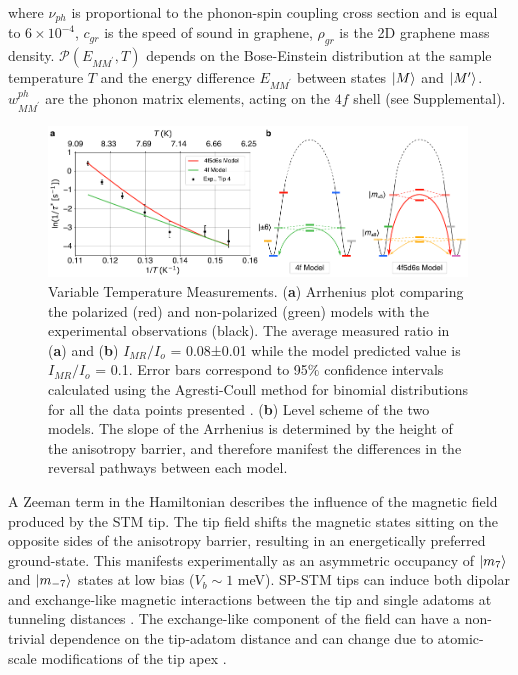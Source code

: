 \documentclass[
reprint,amsmath,amssymb,aps]{revtex4-2}
\begin{document}
where $\nu_{ph}$ is proportional to the phonon-spin coupling cross section and is equal to $6 \times 10^{-4}$, $c_{gr}$ is the speed of sound in graphene, $\rho_{gr}$ is the 2D graphene mass density. $\mathcal{P}\left( E_{MM^{\prime}}, T \right)$ depends on the Bose-Einstein distribution at the sample temperature $T$ and the energy difference $E_{MM^{\prime}}$ between states $\ket{M}$ and $\ket{M^{\prime}}$. $w^{ph}_{MM^{\prime}}$ are the phonon matrix elements, acting on the $4f$ shell (see Supplemental).

\begin{figure}[t!]
\includegraphics[width=0.99\textwidth]{Fig3_new.pdf}
\caption{Variable Temperature Measurements. (\textbf{a}) Arrhenius plot comparing the polarized (red) and non-polarized (green) models with the experimental observations (black). The average measured ratio in (\textbf{a}) and (\textbf{b}) $I_{MR}/I_{o}$ = 0.08±0.01 while the model predicted value is $I_{MR}/I_{o}$ = 0.1. Error bars correspond to 95$\%$ confidence intervals calculated using the Agresti-Coull method for binomial distributions for all the data points presented \citep{agresti1998}. (\textbf{b}) Level scheme of the two models. The slope of the Arrhenius is determined by the height of the anisotropy barrier, and therefore manifest the differences in the reversal pathways between each model. 
\label{fig:temp} }
\end{figure}

A Zeeman term in the Hamiltonian describes the influence of the magnetic field produced by the STM tip. The tip field shifts the magnetic states sitting on the opposite sides of the anisotropy barrier, resulting in an energetically preferred ground-state. This manifests experimentally as an asymmetric occupancy of $\ket{m_7}$ and $\ket{m_{-7}}$ states at low bias ($V_b\sim1$ meV). SP-STM tips can induce both dipolar and exchange-like magnetic interactions between the tip and single adatoms at tunneling distances \cite{yang2019}. The exchange-like component of the field can have a non-trivial dependence on the tip-adatom distance and can change due to atomic-scale modifications of the tip apex \cite{hauptmannQuantifyingExchangeForces2020,tao_SwitchingSingleSpin_2009,lazoFirstprinciplesStudyMagnetic2011,lazoRoleTipSize2008}.
\end{document}
